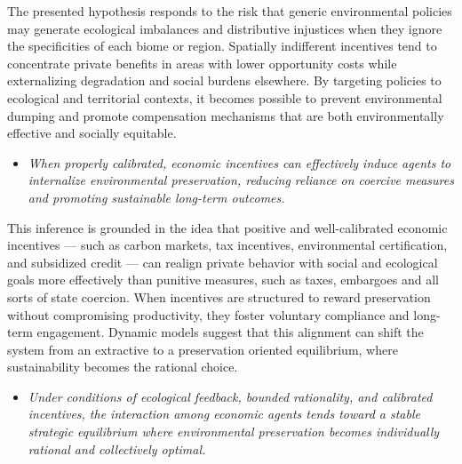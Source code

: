 The presented hypothesis responds to the risk that generic environmental policies may generate ecological imbalances and distributive injustices when they ignore the specificities of each biome or region. Spatially indifferent incentives tend to concentrate private benefits in areas with lower opportunity costs while externalizing degradation and social burdens elsewhere. By targeting policies to ecological and territorial contexts, it becomes possible to prevent environmental dumping and promote compensation mechanisms that are both environmentally effective and socially equitable.

\begin{itemize}  

    \item[\textbf{H4.}] 
    
    \textit{When properly calibrated, economic incentives can effectively induce agents to internalize environmental preservation, reducing reliance on coercive measures and promoting sustainable long-term outcomes.}
\end{itemize}

This inference is grounded in the idea that positive and well-calibrated economic incentives — such as carbon markets, tax incentives, environmental certification, and subsidized credit — can realign private behavior with social and ecological goals more effectively than punitive measures, such as taxes, embargoes and all sorts of state coercion. When incentives are structured to reward preservation without compromising productivity, they foster voluntary compliance and long-term engagement. Dynamic models suggest that this alignment can shift the system from an extractive to a preservation oriented equilibrium, where sustainability becomes the rational choice.

\begin{itemize}  

    \item[\textbf{H5.}]
    
    \textit{Under conditions of ecological feedback, bounded rationality, and calibrated incentives, the interaction among economic agents tends toward a stable strategic equilibrium where environmental preservation becomes individually rational and collectively optimal.}
\end{itemize}

